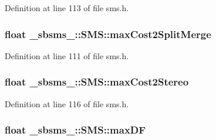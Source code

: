 Definition at line 113 of file sms.\+h.

\subsubsection[{\texorpdfstring{max\+Cost2\+Split\+Merge}{maxCost2SplitMerge}}]{\setlength{\rightskip}{0pt plus 5cm}float \+\_\+sbsms\+\_\+\+::\+S\+M\+S\+::max\+Cost2\+Split\+Merge\hspace{0.3cm}{\ttfamily [protected]}}\hypertarget{class__sbsms___1_1_s_m_s_ac458eca77788aae016121f49e78efdd1}{}\label{class__sbsms___1_1_s_m_s_ac458eca77788aae016121f49e78efdd1}


Definition at line 111 of file sms.\+h.

\subsubsection[{\texorpdfstring{max\+Cost2\+Stereo}{maxCost2Stereo}}]{\setlength{\rightskip}{0pt plus 5cm}float \+\_\+sbsms\+\_\+\+::\+S\+M\+S\+::max\+Cost2\+Stereo\hspace{0.3cm}{\ttfamily [protected]}}\hypertarget{class__sbsms___1_1_s_m_s_a47e7cafcabf3f86df492c51f20aad325}{}\label{class__sbsms___1_1_s_m_s_a47e7cafcabf3f86df492c51f20aad325}


Definition at line 116 of file sms.\+h.

\subsubsection[{\texorpdfstring{max\+DF}{maxDF}}]{\setlength{\rightskip}{0pt plus 5cm}float \+\_\+sbsms\+\_\+\+::\+S\+M\+S\+::max\+DF\hspace{0.3cm}{\ttfamily [protected]}}\hypertarget{class__sbsms___1_1_s_m_s_a3c93453f28f4d44e346e3fe6c7863dfe}{}\label{class__sbsms___1_1_s_m_s_a3c93453f28f4d44e346e3fe6c7863dfe}



